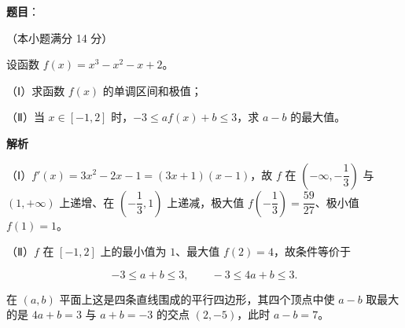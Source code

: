 \begin{answer}

\textbf{题目}：

（本小题满分 14 分）

设函数 $f(x)=x^3-x^2-x+2$。

（Ⅰ）求函数 $f(x)$ 的单调区间和极值；

（Ⅱ）当 $x\in[-1,2]$ 时，$-3\leqslant af(x)+b\leqslant3$，求 $a-b$ 的最大值。

\textbf{解析}

（Ⅰ）$f'(x)=3x^2-2x-1=(3x+1)(x-1)$，故 $f$ 在 $\left(-\infty,-\dfrac13\right)$ 与 $(1,+\infty)$ 上递增、在 $\left(-\dfrac13,1\right)$ 上递减，极大值 $f\left(-\dfrac13\right)=\dfrac{59}{27}$、极小值 $f(1)=1$。

（Ⅱ）$f$ 在 $[-1,2]$ 上的最小值为 $1$、最大值 $f(2)=4$，故条件等价于

\nopagebreak[4]
\[-3\leqslant a+b\leqslant3,\qquad -3\leqslant 4a+b\leqslant3.\]

在 $(a,b)$ 平面上这是四条直线围成的平行四边形，其四个顶点中使 $a-b$ 取最大的是 $4a+b=3$ 与 $a+b=-3$ 的交点 $(2,-5)$，此时 $a-b=7$。


\end{answer}
